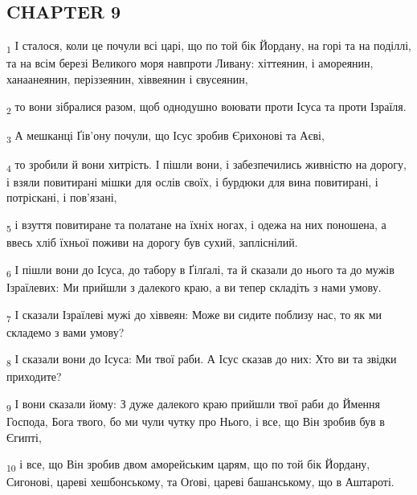 \subsection{CHAPTER 9}
\begin{tcolorbox}
\textsubscript{1} І сталося, коли це почули всі царі, що по той бік Йордану, на горі та на поділлі, та на всім березі Великого моря навпроти Ливану: хіттеянин, і амореянин, ханаанеянин, періззеянин, хіввеянин і євусеянин,
\end{tcolorbox}
\begin{tcolorbox}
\textsubscript{2} то вони зібралися разом, щоб однодушно воювати проти Ісуса та проти Ізраїля.
\end{tcolorbox}
\begin{tcolorbox}
\textsubscript{3} А мешканці Ґів'ону почули, що Ісус зробив Єрихонові та Аєві,
\end{tcolorbox}
\begin{tcolorbox}
\textsubscript{4} то зробили й вони хитрість. І пішли вони, і забезпечились живністю на дорогу, і взяли повитирані мішки для ослів своїх, і бурдюки для вина повитирані, і потріскані, і пов'язані,
\end{tcolorbox}
\begin{tcolorbox}
\textsubscript{5} і взуття повитиране та полатане на їхніх ногах, і одежа на них поношена, а ввесь хліб їхньої поживи на дорогу був сухий, запліснілий.
\end{tcolorbox}
\begin{tcolorbox}
\textsubscript{6} І пішли вони до Ісуса, до табору в Ґілґалі, та й сказали до нього та до мужів Ізраїлевих: Ми прийшли з далекого краю, а ви тепер складіть з нами умову.
\end{tcolorbox}
\begin{tcolorbox}
\textsubscript{7} І сказали Ізраїлеві мужі до хіввеян: Може ви сидите поблизу нас, то як ми складемо з вами умову?
\end{tcolorbox}
\begin{tcolorbox}
\textsubscript{8} І сказали вони до Ісуса: Ми твої раби. А Ісус сказав до них: Хто ви та звідки приходите?
\end{tcolorbox}
\begin{tcolorbox}
\textsubscript{9} І вони сказали йому: З дуже далекого краю прийшли твої раби до Ймення Господа, Бога твого, бо ми чули чутку про Нього, і все, що Він зробив був в Єгипті,
\end{tcolorbox}
\begin{tcolorbox}
\textsubscript{10} і все, що Він зробив двом аморейським царям, що по той бік Йордану, Сигонові, цареві хешбонському, та Оґові, цареві башанському, що в Аштароті.
\end{tcolorbox}
